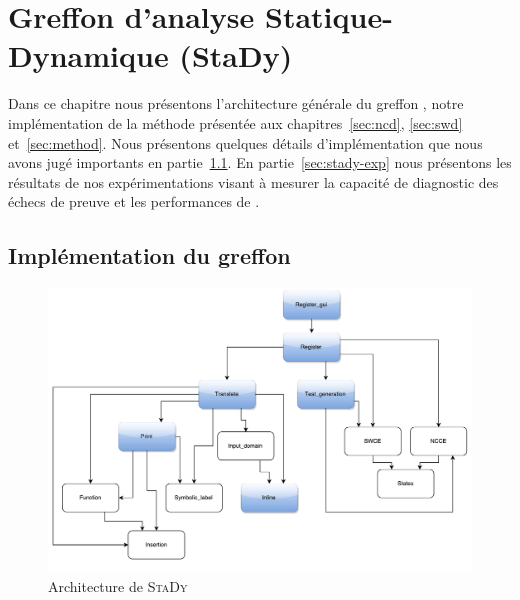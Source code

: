 
\chapter{Greffon d'analyse Statique-Dynamique (StaDy)}
\label{sec:stady}

\chapterintro


Dans ce chapitre nous présentons l'architecture générale du greffon \stady,
notre implémentation de la méthode présentée aux chapitres~\ref{sec:ncd},
\ref{sec:swd} et~\ref{sec:method}.
Nous présentons quelques détails d'implémentation que nous avons jugé
importants en partie~\ref{sec:stady-implem}.
En partie~\ref{sec:stady-exp} nous présentons les résultats de nos
expérimentations visant à mesurer la capacité de diagnostic des échecs de preuve
et les performances de \stady.


\section{Implémentation du greffon \stady}
\label{sec:stady-implem}


\begin{figure}[tb]
  \begin{center}
    \includegraphics[scale=.45]{figures/stady_architecture.pdf}
    \vspace{-.6cm}
    \caption{Architecture de \textsc{StaDy}
      \label{fig:stady-architecture}}
  \end{center}
\end{figure}


